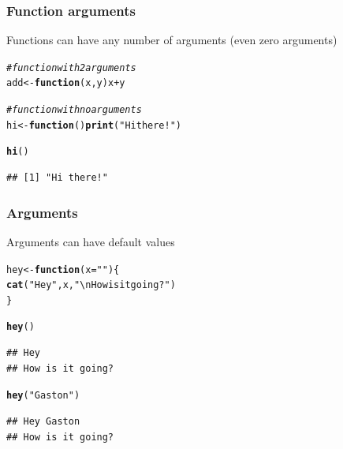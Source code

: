 \documentclass[12pt]{beamer}\usepackage[]{graphicx}\usepackage[]{color}
\makeatletter
\newcommand{\hlstr}[1]{\textcolor[rgb]{0.192,0.494,0.8}{#1}}%
\newcommand{\hlcom}[1]{\textcolor[rgb]{0.678,0.584,0.686}{\textit{#1}}}%
\newcommand{\hlopt}[1]{\textcolor[rgb]{0,0,0}{#1}}%
\newcommand{\hlstd}[1]{\textcolor[rgb]{0.345,0.345,0.345}{#1}}%
\newcommand{\hlkwa}[1]{\textcolor[rgb]{0.161,0.373,0.58}{\textbf{#1}}}%
\newcommand{\hlkwb}[1]{\textcolor[rgb]{0.69,0.353,0.396}{#1}}%
\newcommand{\hlkwc}[1]{\textcolor[rgb]{0.333,0.667,0.333}{#1}}%
\newcommand{\hlkwd}[1]{\textcolor[rgb]{0.737,0.353,0.396}{\textbf{#1}}}%
\newenvironment{kframe}{%
 \def\at@end@of@kframe{}%
 \ifinner\ifhmode%
  \def\at@end@of@kframe{\end{minipage}}%
  \begin{minipage}{\columnwidth}%
 \fi\fi%
 \def\FrameCommand##1{\hskip\@totalleftmargin \hskip-\fboxsep
 \colorbox{shadecolor}{##1}\hskip-\fboxsep
     \hskip-\linewidth \hskip-\@totalleftmargin \hskip\columnwidth}%
 \MakeFramed {\advance\hsize-\width
   \@totalleftmargin\z@ \linewidth\hsize
   \@setminipage}}%
 {\par\unskip\endMakeFramed%
 \at@end@of@kframe}
\newenvironment{knitrout}{}{} %
\makeatother
\begin{document}

\begin{frame}
\begin{center}
\Huge{}
\end{center}
\end{frame}


\begin{frame}[fragile]
\frametitle{Function arguments}

Functions can have any number of arguments (even zero arguments)
\begin{knitrout}\footnotesize
{}\color{fgcolor}\begin{kframe}
\begin{alltt}
\hlcom{# function with 2 arguments}
\hlstd{add} \hlkwb{<-} \hlkwa{function}\hlstd{(}\hlkwc{x}\hlstd{,} \hlkwc{y}\hlstd{) x} \hlopt{+} \hlstd{y}

\hlcom{# function with no arguments}
\hlstd{hi} \hlkwb{<-} \hlkwa{function}\hlstd{()} \hlkwd{print}\hlstd{(}\hlstr{"Hi there!"}\hlstd{)}

\hlkwd{hi}\hlstd{()}
\end{alltt}
\begin{verbatim}
## [1] "Hi there!"
\end{verbatim}
\end{kframe}
\end{knitrout}

\end{frame}


\begin{frame}[fragile]
\frametitle{Arguments}

Arguments can have default values
\begin{knitrout}\footnotesize
{}\color{fgcolor}\begin{kframe}
\begin{alltt}
\hlstd{hey} \hlkwb{<-} \hlkwa{function}\hlstd{(}\hlkwc{x} \hlstd{=} \hlstr{""}\hlstd{) \{}
  \hlkwd{cat}\hlstd{(}\hlstr{"Hey"}\hlstd{, x,} \hlstr{"\textbackslash{}nHow is it going?"}\hlstd{)}
\hlstd{\}}

\hlkwd{hey}\hlstd{()}
\end{alltt}
\begin{verbatim}
## Hey  
## How is it going?
\end{verbatim}
\begin{alltt}
\hlkwd{hey}\hlstd{(}\hlstr{"Gaston"}\hlstd{)}
\end{alltt}
\begin{verbatim}
## Hey Gaston 
## How is it going?
\end{verbatim}
\end{kframe}
\end{knitrout}

\end{frame}
\end{document}
